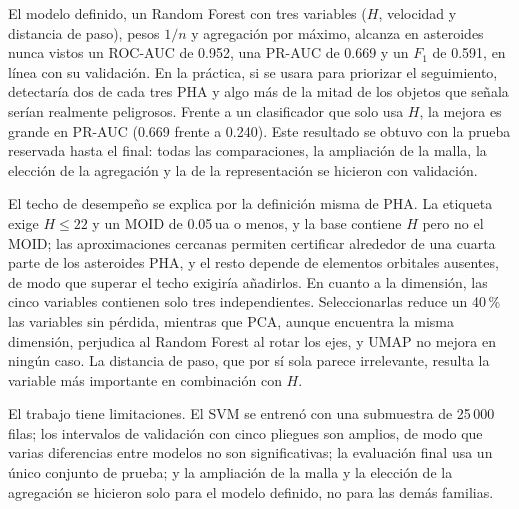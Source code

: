 \documentclass[conference]{IEEEtran}
\begin{document}
El modelo definido, un Random Forest con tres variables ($H$, velocidad y distancia de paso), pesos $1/n$ y agregación por máximo, alcanza en asteroides nunca vistos un ROC-AUC de 0.952, una PR-AUC de 0.669 y un $F_1$ de 0.591, en línea con su validación. En la práctica, si se usara para priorizar el seguimiento, detectaría dos de cada tres PHA y algo más de la mitad de los objetos que señala serían realmente peligrosos. Frente a un clasificador que solo usa $H$, la mejora es grande en PR-AUC (0.669 frente a 0.240). Este resultado se obtuvo con la prueba reservada hasta el final: todas las comparaciones, la ampliación de la malla, la elección de la agregación y la de la representación se hicieron con validación.

El techo de desempeño se explica por la definición misma de PHA. La etiqueta exige $H\le22$ y un MOID de 0.05\,ua o menos, y la base contiene $H$ pero no el MOID; las aproximaciones cercanas permiten certificar alrededor de una cuarta parte de los asteroides PHA, y el resto depende de elementos orbitales ausentes, de modo que superar el techo exigiría añadirlos. En cuanto a la dimensión, las cinco variables contienen solo tres independientes. Seleccionarlas reduce un 40\,\% las variables sin pérdida, mientras que PCA, aunque encuentra la misma dimensión, perjudica al Random Forest al rotar los ejes, y UMAP no mejora en ningún caso. La distancia de paso, que por sí sola parece irrelevante, resulta la variable más importante en combinación con $H$.

El trabajo tiene limitaciones. El SVM se entrenó con una submuestra de 25\,000 filas; los intervalos de validación con cinco pliegues son amplios, de modo que varias diferencias entre modelos no son significativas; la evaluación final usa un único conjunto de prueba; y la ampliación de la malla y la elección de la agregación se hicieron solo para el modelo definido, no para las demás familias.
\end{document}
